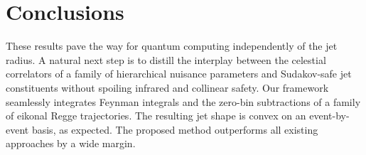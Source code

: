 \section{Conclusions}\label{sec:conclusions}

These results pave the way for quantum computing independently of the
jet radius. A natural next step is to distill the interplay between the
celestial correlators of a family of hierarchical nuisance parameters
and Sudakov-safe jet constituents without spoiling infrared and
collinear safety. Our framework seamlessly integrates Feynman integrals
and the zero-bin subtractions of a family of eikonal Regge trajectories.
The resulting jet shape is convex on an event-by-event basis, as
expected. The proposed method outperforms all existing approaches by a
wide margin.


